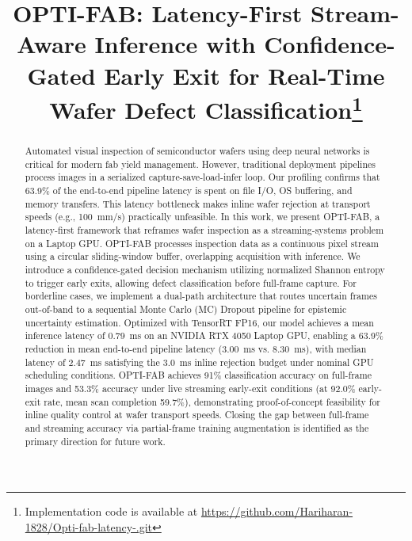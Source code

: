 \documentclass[conference]{IEEEtran}
\begin{document}
\title{OPTI-FAB: Latency-First Stream-Aware Inference with Confidence-Gated Early Exit for Real-Time Wafer Defect Classification\thanks{Implementation code is available at \url{https://github.com/Hariharan-1828/Opti-fab-latency-.git}}}

\author{
\and
{}
}

\maketitle

\begin{abstract}
Automated visual inspection of semiconductor wafers using deep neural networks is critical for modern fab yield management. However, traditional deployment pipelines process images in a serialized capture-save-load-infer loop. Our profiling confirms that 63.9\% of the end-to-end pipeline latency is spent on file I/O, OS buffering, and memory transfers. This latency bottleneck makes inline wafer rejection at transport speeds (e.g., 100~mm/s) practically unfeasible. In this work, we present OPTI-FAB, a latency-first framework that reframes wafer inspection as a streaming-systems problem on a Laptop GPU. OPTI-FAB processes inspection data as a continuous pixel stream using a circular sliding-window buffer, overlapping acquisition with inference. We introduce a confidence-gated decision mechanism utilizing normalized Shannon entropy to trigger early exits, allowing defect classification before full-frame capture. For borderline cases, we implement a dual-path architecture that routes uncertain frames out-of-band to a sequential Monte Carlo (MC) Dropout pipeline for epistemic uncertainty estimation. Optimized with TensorRT FP16, our model achieves a mean inference latency of 0.79~ms on an NVIDIA RTX 4050 Laptop GPU, enabling a 63.9\% reduction in mean end-to-end pipeline latency (3.00~ms vs. 8.30~ms), with median latency of 2.47~ms satisfying the 3.0~ms inline rejection budget under nominal GPU scheduling conditions. OPTI-FAB achieves 91\% classification accuracy on full-frame images and 53.3\% accuracy under live streaming early-exit conditions (at 92.0\% early-exit rate, mean scan completion 59.7\%), demonstrating proof-of-concept feasibility for inline quality control at wafer transport speeds. Closing the gap between full-frame and streaming accuracy via partial-frame training augmentation is identified as the primary direction for future work.
\end{abstract}
\end{document}
